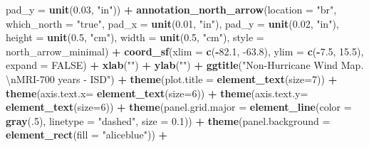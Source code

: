 \documentclass[12pt,oneside]{reedthesis}
\newenvironment{Shaded}{\begin{snugshade}}{\end{snugshade}}
\newcommand{\CharTok}[1]{\textcolor[rgb]{0.31,0.60,0.02}{#1}}
\newcommand{\DataTypeTok}[1]{\textcolor[rgb]{0.13,0.29,0.53}{#1}}
\newcommand{\DecValTok}[1]{\textcolor[rgb]{0.00,0.00,0.81}{#1}}
\newcommand{\FloatTok}[1]{\textcolor[rgb]{0.00,0.00,0.81}{#1}}
\newcommand{\KeywordTok}[1]{\textcolor[rgb]{0.13,0.29,0.53}{\textbf{#1}}}
\newcommand{\NormalTok}[1]{#1}
\newcommand{\OperatorTok}[1]{\textcolor[rgb]{0.81,0.36,0.00}{\textbf{#1}}}
\newcommand{\OtherTok}[1]{\textcolor[rgb]{0.56,0.35,0.01}{#1}}
\newcommand{\StringTok}[1]{\textcolor[rgb]{0.31,0.60,0.02}{#1}}
\begin{document}
\begin{Shaded}
\begin{Highlighting}[]
   \DataTypeTok{pad_y =} \KeywordTok{unit}\NormalTok{(}\FloatTok{0.03}\NormalTok{, }\StringTok{"in"}\NormalTok{)) }\OperatorTok{+}\StringTok{ }
\StringTok{  }\KeywordTok{annotation_north_arrow}\NormalTok{(}\DataTypeTok{location =} \StringTok{"br"}\NormalTok{, }\DataTypeTok{which_north =} \StringTok{"true"}\NormalTok{, }\DataTypeTok{pad_x =} \KeywordTok{unit}\NormalTok{(}\FloatTok{0.01}\NormalTok{, }\StringTok{"in"}\NormalTok{), }\DataTypeTok{pad_y =} \KeywordTok{unit}\NormalTok{(}\FloatTok{0.02}\NormalTok{, }\StringTok{"in"}\NormalTok{), }\DataTypeTok{height =} \KeywordTok{unit}\NormalTok{(}\FloatTok{0.5}\NormalTok{, }\StringTok{"cm"}\NormalTok{), }
   \DataTypeTok{width =} \KeywordTok{unit}\NormalTok{(}\FloatTok{0.5}\NormalTok{, }\StringTok{"cm"}\NormalTok{), }\DataTypeTok{style =}\NormalTok{ north_arrow_minimal) }\OperatorTok{+}
\StringTok{  }\KeywordTok{coord_sf}\NormalTok{(}\DataTypeTok{xlim =} \KeywordTok{c}\NormalTok{(}\OperatorTok{-}\FloatTok{82.1}\NormalTok{, }\FloatTok{-63.8}\NormalTok{), }\DataTypeTok{ylim =} \KeywordTok{c}\NormalTok{(}\OperatorTok{-}\FloatTok{7.5}\NormalTok{, }\FloatTok{15.5}\NormalTok{), }\DataTypeTok{expand =} \OtherTok{FALSE}\NormalTok{) }\OperatorTok{+}
\StringTok{  }\KeywordTok{xlab}\NormalTok{(}\StringTok{""}\NormalTok{) }\OperatorTok{+}\StringTok{ }
\StringTok{  }\KeywordTok{ylab}\NormalTok{(}\StringTok{""}\NormalTok{) }\OperatorTok{+}\StringTok{ }
\StringTok{  }\KeywordTok{ggtitle}\NormalTok{(}\StringTok{"Non-Hurricane Wind Map. }\CharTok{\textbackslash{}n}\StringTok{MRI-700 years - ISD"}\NormalTok{) }\OperatorTok{+}\StringTok{ }
\StringTok{  }\KeywordTok{theme}\NormalTok{(}\DataTypeTok{plot.title =} \KeywordTok{element_text}\NormalTok{(}\DataTypeTok{size=}\DecValTok{7}\NormalTok{)) }\OperatorTok{+}
\StringTok{  }\KeywordTok{theme}\NormalTok{(}\DataTypeTok{axis.text.x=} \KeywordTok{element_text}\NormalTok{(}\DataTypeTok{size=}\DecValTok{6}\NormalTok{)) }\OperatorTok{+}\StringTok{ }
\StringTok{  }\KeywordTok{theme}\NormalTok{(}\DataTypeTok{axis.text.y=} \KeywordTok{element_text}\NormalTok{(}\DataTypeTok{size=}\DecValTok{6}\NormalTok{)) }\OperatorTok{+}
\StringTok{  }\KeywordTok{theme}\NormalTok{(}\DataTypeTok{panel.grid.major =} \KeywordTok{element_line}\NormalTok{(}\DataTypeTok{color =} \KeywordTok{gray}\NormalTok{(.}\DecValTok{5}\NormalTok{), }\DataTypeTok{linetype =} \StringTok{"dashed"}\NormalTok{, }\DataTypeTok{size =} \FloatTok{0.1}\NormalTok{)) }\OperatorTok{+}
\StringTok{  }\KeywordTok{theme}\NormalTok{(}\DataTypeTok{panel.background =} \KeywordTok{element_rect}\NormalTok{(}\DataTypeTok{fill =} \StringTok{"aliceblue"}\NormalTok{)) }\OperatorTok{+}

\end{Highlighting}
\end{Shaded}
\end{document}
